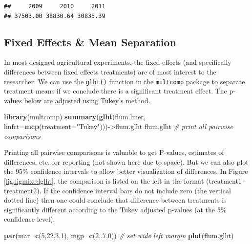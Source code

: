 \documentclass[letterpaper,]{book}
\newenvironment{Shaded}{\begin{snugshade}}{\end{snugshade}}
\newcommand{\CommentTok}[1]{\textcolor[rgb]{0.56,0.35,0.01}{\textit{#1}}}
\newcommand{\DataTypeTok}[1]{\textcolor[rgb]{0.13,0.29,0.53}{#1}}
\newcommand{\DecValTok}[1]{\textcolor[rgb]{0.00,0.00,0.81}{#1}}
\newcommand{\KeywordTok}[1]{\textcolor[rgb]{0.13,0.29,0.53}{\textbf{#1}}}
\newcommand{\NormalTok}[1]{#1}
\newcommand{\StringTok}[1]{\textcolor[rgb]{0.31,0.60,0.02}{#1}}
\begin{document}
\begin{verbatim}
##     2009     2010     2011 
## 37503.00 38830.64 30835.39
\end{verbatim}

\hypertarget{fixed-effects-mean-separation}{%
\subsection{Fixed Effects \& Mean Separation}\label{fixed-effects-mean-separation}}

In most designed agricultural experiments, the fixed effects (and specifically differences between fixed effects treatments) are of most interest to the researcher. We can use the \texttt{glht()} function in the \texttt{multcomp} package to separate treatment means if we conclude there is a significant treatment effect. The p-values below are adjusted using Tukey's method.

\begin{Shaded}
\begin{Highlighting}[]
\KeywordTok{library}\NormalTok{(multcomp)}
\KeywordTok{summary}\NormalTok{(}\KeywordTok{glht}\NormalTok{(flum.lmer, }\DataTypeTok{linfct=}\KeywordTok{mcp}\NormalTok{(}\DataTypeTok{treatment=}\StringTok{"Tukey"}\NormalTok{)))->flum.glht}
\NormalTok{flum.glht }\CommentTok{# print all pairwise comparisons}
\end{Highlighting}
\end{Shaded}

Printing all pairwise comparisons is valuable to get P-values, estimates of differences, etc. for reporting (not shown here due to space). But we can also plot the 95\% confidence intervals to allow better visualization of differences. In Figure \ref{fig:figmixedglht}, the comparison is listed on the left in the format (treatment1 - treatment2). If the confidence interval bars do not include zero (the vertical dotted line) then one could conclude that difference between treatments is significantly different according to the Tukey adjusted p-values (at the 5\% confidence level).



\begin{Shaded}
\begin{Highlighting}[]
\KeywordTok{par}\NormalTok{(}\DataTypeTok{mar=}\KeywordTok{c}\NormalTok{(}\DecValTok{5}\NormalTok{,}\DecValTok{22}\NormalTok{,}\DecValTok{3}\NormalTok{,}\DecValTok{1}\NormalTok{), }\DataTypeTok{mgp=}\KeywordTok{c}\NormalTok{(}\DecValTok{2}\NormalTok{,.}\DecValTok{7}\NormalTok{,}\DecValTok{0}\NormalTok{)) }\CommentTok{# set wide left margin }
\KeywordTok{plot}\NormalTok{(flum.glht)}
\end{Highlighting}
\end{Shaded}
\end{document}
